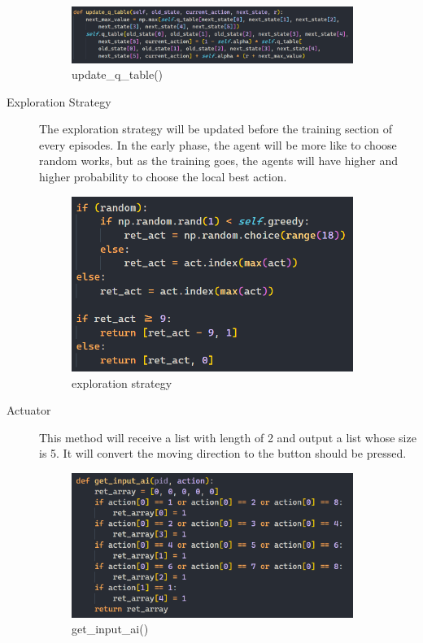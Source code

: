 \documentclass[14pt]{extarticle}
\begin{document}
\begin{description}
\begin{figure}[H]
\begin{center}
			\includegraphics[width=0.9\textwidth]{update_rule.png}
			\caption{update\_q\_table()}
		\end{center}
	\end{figure} 
    \item[Exploration Strategy] 
    The exploration strategy will be updated before the training section of every episodes. In the early phase, the agent will be more like to choose random works, but as the training goes, the agents will have higher and higher probability to choose the local best action. 
    \begin{figure}[H]
		\begin{center}
			\includegraphics[width=0.9\textwidth]{exploration_strategy.png}
			\caption{exploration strategy}
		\end{center}
	\end{figure} 
    \item[Actuator]  
    This method will receive a list with length of 2 and output a list whose size is 5. It will convert the moving direction to the button should be pressed.
    \begin{figure}[H]
		\begin{center}
			\includegraphics[width=0.9\textwidth]{actuator.png}
			\caption{get\_input\_ai()}
		\end{center}
	\end{figure}    
\end{description}	
    
\end{document}
